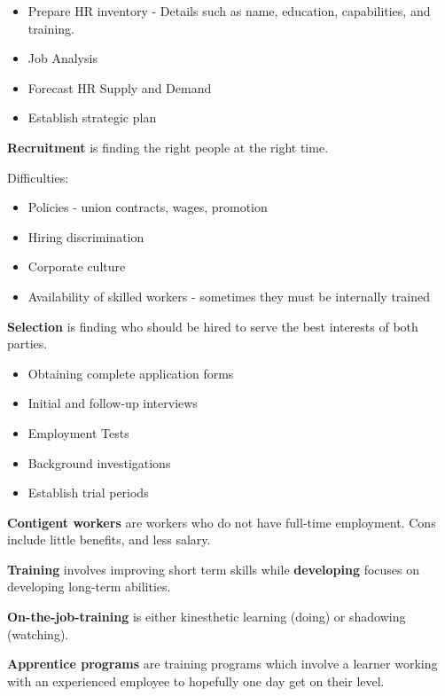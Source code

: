 \documentclass[english, 12pt]{article}
\begin{document}
\begin{itemize}
\item Prepare HR inventory - Details such as name, education, capabilities, and training.
\item Job Analysis
\item Forecast HR Supply and Demand
\item Establish strategic plan
\end{itemize}
\begin{defn}
\textbf{Recruitment} is finding the right people at the right time.
\end{defn}
Difficulties:
\begin{itemize}
\item Policies - union contracts, wages, promotion
\item Hiring discrimination
\item Corporate culture
\item Availability of skilled workers - sometimes they must be internally trained
\end{itemize}
\begin{defn}
\textbf{Selection} is finding who should be hired to serve the best interests of both parties.
\end{defn}
\begin{itemize}
\item Obtaining complete application forms
\item Initial and follow-up interviews
\item Employment Tests
\item Background investigations
\item Establish trial periods
\end{itemize}
\begin{defn}
\textbf{Contigent workers} are workers who do not have full-time employment. Cons include little benefits, and less salary.
\end{defn}
\begin{defn}
\textbf{Training} involves improving short term skills while \textbf{developing} focuses on developing long-term abilities.
\end{defn}
\begin{defn}
\textbf{On-the-job-training} is either kinesthetic learning (doing) or shadowing (watching).
\end{defn}
\begin{defn}
\textbf{Apprentice programs} are training programs which involve a learner working with an experienced employee to hopefully one day get on their level.
\end{defn}
\end{document}
